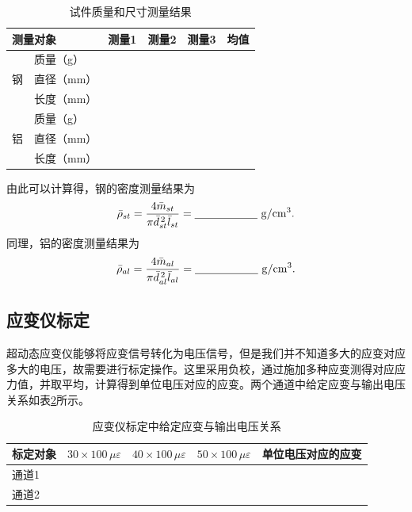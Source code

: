 \documentclass[UTF8,a4paper,12pt]{ctexart}
\newcommand{\blank}[1][2.5cm]{\mbox{\underline{\hspace{#1}}}}
\numberwithin{equation}{section}
\begin{document}
\begin{table}[H]
\centering
\caption{试件质量和尺寸测量结果}
\label{tab:exp1-density}
\begin{tabular}{llcccc}
\toprule
\multicolumn{2}{l}{测量对象} & 测量1 & 测量2 & 测量3 & 均值\\
\midrule
\multirow{3}{*}{钢} & 质量（g） & \blank[1.3cm] & \blank[1.3cm] & \blank[1.3cm] & \blank[1.3cm]\\
 & 直径（mm） & \blank[1.3cm] & \blank[1.3cm] & \blank[1.3cm] & \blank[1.3cm]\\
 & 长度（mm） & \blank[1.3cm] & \blank[1.3cm] & \blank[1.3cm] & \blank[1.3cm]\\
\midrule
\multirow{3}{*}{铝} & 质量（g） & \blank[1.3cm] & \blank[1.3cm] & \blank[1.3cm] & \blank[1.3cm]\\
 & 直径（mm） & \blank[1.3cm] & \blank[1.3cm] & \blank[1.3cm] & \blank[1.3cm]\\
 & 长度（mm） & \blank[1.3cm] & \blank[1.3cm] & \blank[1.3cm] & \blank[1.3cm]\\
\bottomrule
\end{tabular}
\end{table}

由此可以计算得，钢的密度测量结果为
\begin{equation}
  \bar{\rho}_{st}=\frac{4\bar{m}_{st}}{\pi\bar{d}_{st}^{\,2}\bar{l}_{st}}
  =\blank[2cm]\ \mathrm{g/cm^3}.
\end{equation}
同理，铝的密度测量结果为
\begin{equation}
  \bar{\rho}_{al}=\frac{4\bar{m}_{al}}{\pi\bar{d}_{al}^{\,2}\bar{l}_{al}}
  =\blank[2cm]\ \mathrm{g/cm^3}.
\end{equation}

\subsection{应变仪标定}
超动态应变仪能够将应变信号转化为电压信号，但是我们并不知道多大的应变对应多大的电压，故需要进行标定操作。这里采用负校，通过施加多种应变测得对应应力值，并取平均，计算得到单位电压对应的应变。两个通道中给定应变与输出电压关系如表\ref{tab:exp1-calibration}所示。

\begin{table}[H]
\centering
\caption{应变仪标定中给定应变与输出电压关系}
\label{tab:exp1-calibration}
\begin{tabular}{lcccc}
\toprule
标定对象 & $30\times100\,\mu\varepsilon$ & $40\times100\,\mu\varepsilon$ & $50\times100\,\mu\varepsilon$ & 单位电压对应的应变\\
\midrule
通道1 & \blank[1.5cm] & \blank[1.5cm] & \blank[1.5cm] & \blank[2cm]\\
通道2 & \blank[1.5cm] & \blank[1.5cm] & \blank[1.5cm] & \blank[2cm]\\
\bottomrule
\end{tabular}
\end{table}
\end{document}
